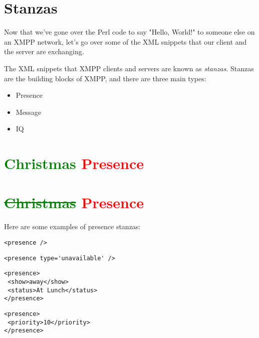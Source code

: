 \section{Stanzas}

Now that we've gone over the Perl code to say "Hello, World!" to someone else on an XMPP
network, let's go over some of the XML snippets that our client and the server are exchanging.
\pause

The XML snippets that XMPP clients and servers are known as \textit{stanzas}.  Stanzas are the
building blocks of XMPP, and there are three main types:
\pause

\begin{itemize}
\item Presence
\pause
\item Message
\pause
\item IQ
\end{itemize}

\newpage
\section{\textcolor{green}{Christmas} \textcolor{red}{Presence}}

\newpage
\section{\textcolor{green}{\st{Christmas}} \textcolor{red}{Presence}}

\pause
Here are some examples of presence stanzas:

\begin{shaded}
\begin{verbatim}
<presence />
\end{verbatim}
\end{shaded}

\pause
\begin{shaded}
\begin{verbatim}
<presence type='unavailable' />
\end{verbatim}
\end{shaded}

\pause
\begin{shaded}
\begin{verbatim}
<presence>
 <show>away</show>
 <status>At Lunch</status>
</presence>
\end{verbatim}
\end{shaded}

\pause
\begin{shaded}
\begin{verbatim}
<presence>
 <priority>10</priority>
</presence>
\end{verbatim}
\end{shaded}

